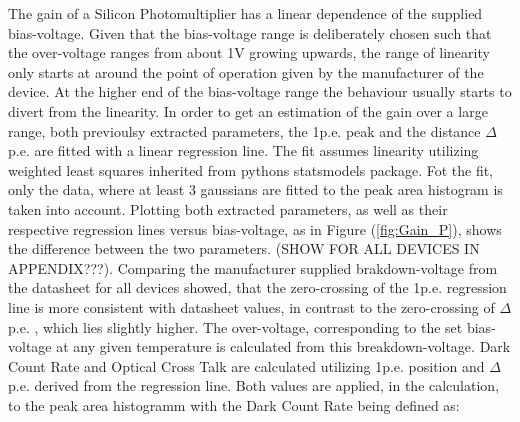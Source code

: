 \documentclass[12pt,article,type=msc,colorback,accentcolor=tud9c]{tudthesis}
\begin{document}
\begin{wrapfigure}{R}{0.5\textwidth}
\centering
\texttt{[image: D:/OwnCloudData/00\_WriteUp/04\_Thesis/Pic/GainFit/\{GainFit\_delta\_pe]}.png}
\caption{\label{fig:Gain_P}1p.e. position and $\Delta$p.e. plotted versus bias-voltage}
\end{wrapfigure}
The gain of a Silicon Photomultiplier has a linear dependence of the supplied bias-voltage. Given that the bias-voltage range is deliberately chosen such that the over-voltage ranges from about 1V growing upwards, the range of linearity only starts at around the point of operation given by the manufacturer of the device. At the higher end of the bias-voltage range the behaviour usually starts to divert from the linearity. In order to get an estimation of the gain over a large range, both previoulsy extracted parameters, the 1p.e. peak and the distance $\Delta$p.e. are fitted with a linear regression line. The fit assumes linearity utilizing weighted least squares inherited from pythons statsmodels package. Fot the fit, only the data, where at least 3 gaussians are fitted to the peak area histogram is taken into account. Plotting both extracted parameters, as well as their respective regression lines versus bias-voltage, as in Figure (\ref{fig:Gain_P}), shows the difference between the two parameters. (SHOW FOR ALL DEVICES IN APPENDIX???). Comparing the manufacturer supplied brakdown-voltage from the datasheet for all devices showed, that the zero-crossing of the 1p.e. regression line is more consistent with datasheet values, in contrast to the zero-crossing of $\Delta$p.e. , which lies slightly higher. The over-voltage, corresponding to the set bias-voltage at any given temperature is calculated from this breakdown-voltage. 
Dark Count Rate and Optical Cross Talk are calculated utilizing 1p.e. position and $\Delta$p.e. derived from the regression line. Both values are applied, in the calculation, to the peak area histogramm with the Dark Count Rate being defined as:
\end{document}
